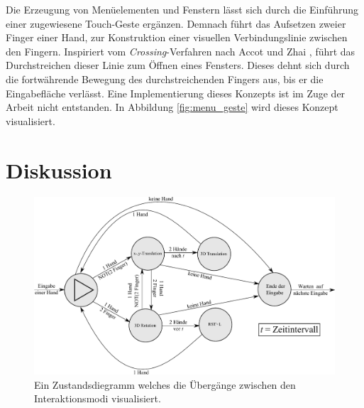 Die Erzeugung von Menüelementen und Fenstern lässt sich durch die Einführung einer zugewiesene Touch-Geste ergänzen. Demnach führt das Aufsetzen zweier Finger einer Hand, zur Konstruktion einer visuellen Verbindungslinie zwischen den Fingern. Inspiriert vom \emph{Crossing}-Verfahren nach Accot und Zhai \cite{accot:2002}, führt das Durchstreichen dieser Linie zum Öffnen eines Fensters. Dieses dehnt sich durch die fortwährende Bewegung des durchstreichenden Fingers aus, bis er die Eingabefläche verlässt. Eine Implementierung dieses Konzepts ist im Zuge der Arbeit nicht entstanden. In Abbildung \ref{fig:menu_geste} wird dieses Konzept visualisiert.


\section{Diskussion}
\label{sec:diskussion_wechsel}

\begin{figure}
	\begin{center}
		\includegraphics[width=12cm]{img/zustandsdiagramm.pdf}
	\end{center}
	\caption{Ein Zustandsdiegramm welches die Übergänge zwischen den Interaktionsmodi visualisiert.}
	\label{fig:zustandsdiagramm}
\end{figure}

